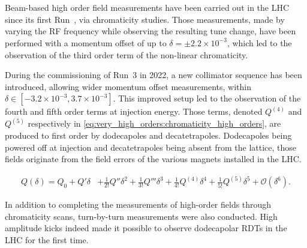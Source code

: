 \chapter{}
\thumbforchapter{}

\section{}

Beam-based high order field measurements have been carried out in the LHC since its first
Run~\cite{maclean_non-linear_2011, maclean_commissioning_2016-1}, via
chromaticity studies. Those measurements, made by varying the RF frequency while observing the
resulting tune change, have been performed with a momentum offset of up to $\delta = \pm 2.2 \times
10^{-3}$, which led to the observation of the third order term of the non-linear chromaticity.

During the commissioning of Run~3 in 2022, a new collimator sequence has been introduced, allowing wider
momentum offset measurements, within $\delta \in [-3.2\times 10^{-3},3.7 \times 10^{-3}]$. This
improved setup led to the observation of the fourth and fifth order terms at injection energy.
Those terms, denoted $Q^{(4)}$ and $Q^{(5)}$ respectively in
\cref{eq:very_high_orders:chromaticity_high_orders}, are produced to first order by dodecapoles and
decatetrapoles. Dodecapoles being powered off at injection and decatetrapoles being absent from the
lattice, those fields originate from the field errors of the various magnets installed in the LHC.

\begin{equation}
  \begin{aligned}
    Q(\delta) = Q_0 + Q'\delta &+ \frac{1}{2!}Q''\delta^2 + \frac{1}{3!}Q'''\delta^3
                                + \frac{1}{4!}Q^{(4)}\delta^4  + \frac{1}{5!}Q^{(5)}\delta^5
                                + \mathcal{O}(\delta^6).
  \end{aligned}
  \label{eq:very_high_orders:chromaticity_high_orders}
\end{equation}

In addition to completing the measurements of high-order fields through chromaticity scans,
turn-by-turn measurements were also conducted. High amplitude kicks indeed made it possible to
observe dodecapolar RDTs in the LHC for the first time.



